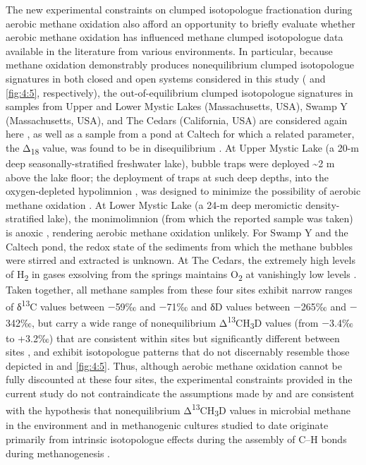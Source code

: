 The new experimental constraints on clumped isotopologue fractionation
during aerobic methane oxidation also afford an opportunity to briefly
evaluate whether aerobic methane oxidation has influenced methane
clumped isotopologue data available in the literature from various
environments. In particular, because methane oxidation demonstrably
produces nonequilibrium clumped isotopologue signatures in both closed
and open systems considered in this study ( and \ref{fig:4:5}, respectively),
the out-of-equilibrium clumped isotopologue signatures in samples from
Upper and Lower Mystic Lakes (Massachusetts, USA), Swamp Y
(Massachusetts, USA), and The Cedars (California, USA) are considered
again here \parencite{Wang++_2015_S}, as well as a sample from a pond at
Caltech for which a related parameter, the Δ\textsubscript{18} value,
was found to be in disequilibrium \parencite{Stolper++_2015_GCA}. At Upper
Mystic Lake (a 20-m deep seasonally-stratified freshwater lake), bubble
traps were deployed \textasciitilde{}2 m above the lake floor; the
deployment of traps at such deep depths, into the oxygen-depleted
hypolimnion \parencite{Peterson_2005_thesis}, was designed to minimize the possibility
of aerobic methane oxidation \parencite{Wang++_2015_S}. At Lower Mystic Lake
(a 24-m deep meromictic density-stratified lake), the monimolimnion
(from which the reported sample was taken) is anoxic \parencite{Wang++_2015_S}, rendering aerobic methane oxidation unlikely. For Swamp Y and the
Caltech pond, the redox state of the sediments from which the methane
bubbles were stirred and extracted is unknown. At The Cedars, the
extremely high levels of H\textsubscript{2} in gases exsolving from the
springs maintains O\textsubscript{2} at vanishingly low levels \parencite[near the
lower bound of H\textsubscript{2}O stability;][]{Morrill++_2013_GCA}.
Taken together, all methane samples from these four sites exhibit narrow
ranges of δ\textsuperscript{13}C values between $-$59‰ and $-$71‰ and δD
values between $-$265‰ and $-$342‰, but carry a wide range of nonequilibrium
Δ\textsuperscript{13}CH\textsubscript{3}D values (from $-$3.4‰ to +3.2‰)
that are consistent within sites but significantly different between
sites \parencite{Wang++_2015_S}, and exhibit isotopologue patterns that do not
discernably resemble those depicted in  and \ref{fig:4:5}. Thus, although
aerobic methane oxidation cannot be fully discounted at these four
sites, the experimental constraints provided in the current study do not
contraindicate the assumptions made by \textcite{Wang++_2015_S} and are
consistent with the hypothesis that nonequilibrium
Δ\textsuperscript{13}CH\textsubscript{3}D values in microbial methane in
the environment and in methanogenic cultures studied to date originate
primarily from intrinsic isotopologue effects during the assembly of
C--H bonds during methanogenesis \parencite{Stolper++_2015_GCA,Wang++_2015_S}.

